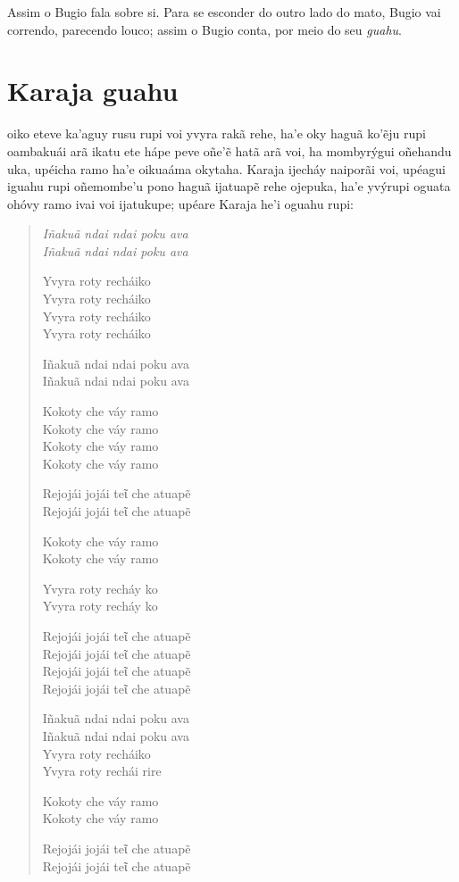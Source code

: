 Assim o Bugio fala sobre si. Para se esconder do outro lado do mato,
Bugio vai correndo, parecendo louco; assim o Bugio conta, por meio do
seu \emph{guahu}.

\chapter{Karaja guahu}

 oiko eteve ka'aguy rusu rupi voi yvyra rakã rehe, ha'e oky haguã
ko'ẽju rupi oambakuái arã ikatu ete hápe peve oñe'ẽ hatã arã voi, ha
mombyrýgui oñehandu uka, upéicha ramo ha'e oikuaáma okytaha. Karaja
ijecháy naiporãi voi, upéagui iguahu rupi oñemombe'u pono haguã ijatuapẽ
rehe ojepuka, ha'e yvýrupi oguata ohóvy ramo ivai voi ijatukupe; upéare
Karaja he'i oguahu rupi:

\begin{verse}
\itshape
Iñakuã ndai ndai poku ava\\
Iñakuã ndai ndai poku ava

Yvyra roty recháiko\\
Yvyra roty recháiko\\
Yvyra roty recháiko\\
Yvyra roty recháiko

Iñakuã ndai ndai poku ava\\
Iñakuã ndai ndai poku ava

Kokoty che váy ramo\\
Kokoty che váy ramo\\
Kokoty che váy ramo\\
Kokoty che váy ramo

Rejojái jojái teῖ che atuapẽ\\
Rejojái jojái teῖ che atuapẽ

\pagebreak
Kokoty che váy ramo\\
Kokoty che váy ramo

Yvyra roty recháy ko\\
Yvyra roty recháy ko

Rejojái jojái teῖ che atuapẽ\\
Rejojái jojái teῖ che atuapẽ\\
Rejojái jojái teῖ che atuapẽ\\
Rejojái jojái teῖ che atuapẽ

Iñakuã ndai ndai poku ava\\
Iñakuã ndai ndai poku ava\\
Yvyra roty recháiko\\
Yvyra roty rechái rire

Kokoty che váy ramo\\
Kokoty che váy ramo

Rejojái jojái teῖ che atuapẽ\\
Rejojái jojái teῖ che atuapẽ
\end{verse}

